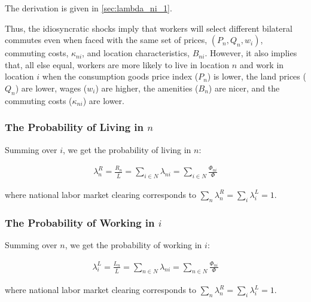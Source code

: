 \documentclass[10pt]{article}
\begin{document}
The derivation is given in \autoref{sec:lambda_ni_1}.

Thus, the idiosyncratic shocks imply that 
workers will select different bilateral commutes even 
when faced with the same set of prices, $(P_n, Q_n, w_i)$,
commuting costs, $\kappa_{n i}$, and location characteristics, $B_{n i}$.
However, it also implies that, all else equal, 
workers are more likely to live in location $n$
and work in location $i$ when 
the consumption goods price index ($P_n$) is lower,
the land prices ($Q_n$) are lower, wages ($w_i$) are higher,
the amenities ($B_n$) are nicer, and the commuting 
costs ($\kappa_{n i}$) are lower.

\subsubsection{The Probability of Living in $n$}

Summing over $i$, we get the probability of living in $n$:

\begin{align}
    \lambda_n^R=\frac{R_n}{\bar{L}}=\sum_{i \in N} \lambda_{n i}=\sum_{i \in N} \frac{\Phi_{n i}}{\Phi} \label{eq:lambda_n_R}
\end{align}

where national labor market clearing 
corresponds to $\sum_n \lambda_n^R=\sum_i \lambda_i^L=1$.


\subsubsection{The Probability of Working in $i$}

Summing over $n$, we get the probability of working in $i$:

\begin{align}
    \lambda_i^L=\frac{L_n}{\bar{L}}=\sum_{n \in N} \lambda_{n i}=\sum_{n \in N} \frac{\Phi_{n i}}{\Phi} \label{eq:lambda_i_L}
\end{align}

where national labor market clearing 
corresponds to $\sum_n \lambda_n^R=\sum_i \lambda_i^L=1$.

\end{document}
